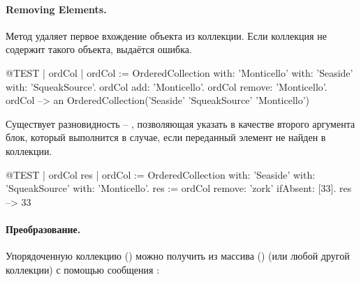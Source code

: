 \documentclass[a4paper,10pt,twoside]{book}
\begin{document}
\paragraph{Removing Elements.} Метод   удаляет первое вхождение объекта из коллекции. Если коллекция не содержит такого объекта, выдаётся ошибка.

\begin{code}{@TEST | ordCol | ordCol := OrderedCollection with: 'Monticello' with: 'Seaside' with: 'SqueakSource'.}
ordCol add: 'Monticello'.
ordCol remove: 'Monticello'.
ordCol --> an OrderedCollection('Seaside' 'SqueakSource' 'Monticello')
\end{code}

Существует разновидность  -- , позволяющая указать
в качестве второго аргумента блок, который выполнится в случае, если переданный элемент не найден в коллекции.

\begin{code}{@TEST | ordCol res | ordCol := OrderedCollection with: 'Seaside' with: 'SqueakSource' with: 'Monticello'.}
res := ordCol remove: 'zork' ifAbsent: [33].
res --> 33
\end{code}

\paragraph{Преобразование.}
Упорядоченную коллекцию () можно получить из массива () (или любой другой коллекции) с помощью сообщения :
\end{document}

